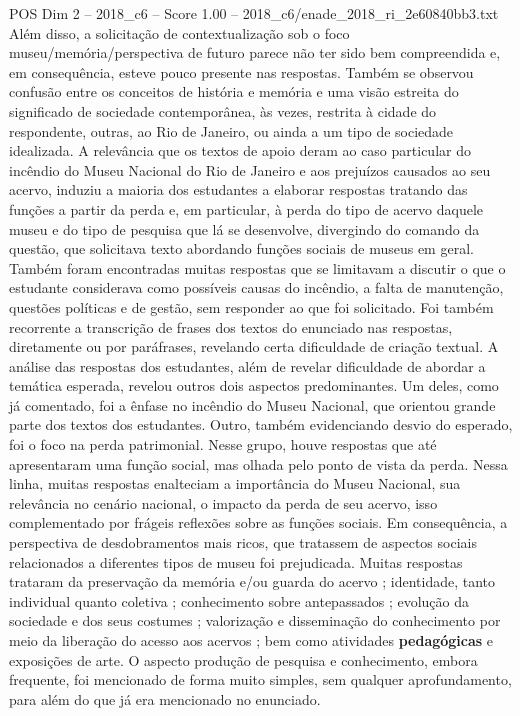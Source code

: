 \begin{textsample}{POS Dim 2 – 2018\_c6 – Score 1.00 – 2018\_c6/enade\_2018\_ri\_2e60840bb3.txt}
Além disso, a solicitação de contextualização sob o foco museu/memória/perspectiva de futuro parece não ter sido bem compreendida e, em consequência, esteve pouco presente nas respostas.
Também se observou confusão entre os conceitos de história e memória e uma visão estreita do significado de sociedade contemporânea, às vezes, restrita à cidade do respondente, outras, ao Rio de Janeiro, ou ainda a um tipo de sociedade idealizada.
A relevância que os textos de apoio deram ao caso particular do incêndio do Museu Nacional do Rio de Janeiro e aos prejuízos causados ao seu acervo, induziu a maioria dos estudantes a elaborar respostas tratando das funções a partir da perda e, em particular, à perda do tipo de acervo daquele museu e do tipo de pesquisa que lá se desenvolve, divergindo do comando da questão, que solicitava texto abordando funções sociais de museus em geral.
Também foram encontradas muitas respostas que se limitavam a discutir o que o estudante considerava como possíveis causas do incêndio, a falta de manutenção, questões políticas e de gestão, sem responder ao que foi solicitado.
Foi também recorrente a transcrição de frases dos textos do enunciado nas respostas, diretamente ou por paráfrases, revelando certa dificuldade de criação textual.
A análise das respostas dos estudantes, além de revelar dificuldade de abordar a temática esperada, revelou outros dois aspectos predominantes.
Um deles, como já comentado, foi a ênfase no incêndio do Museu Nacional, que orientou grande parte dos textos dos estudantes.
Outro, também evidenciando desvio do esperado, foi o foco na perda patrimonial.
Nesse grupo, houve respostas que até apresentaram uma função social, mas olhada pelo ponto de vista da perda.
Nessa linha, muitas respostas enalteciam a importância do Museu Nacional, sua relevância no cenário nacional, o impacto da perda de seu acervo, isso complementado por frágeis reflexões sobre as funções sociais.
Em consequência, a perspectiva de desdobramentos mais ricos, que tratassem de aspectos sociais relacionados a diferentes tipos de museu foi prejudicada.
Muitas respostas trataram da preservação da memória e/ou guarda do acervo ; identidade, tanto individual quanto coletiva ; conhecimento sobre antepassados ; evolução da sociedade e dos seus costumes ; valorização e disseminação do conhecimento por meio da liberação do acesso aos acervos ; bem como atividades \textbf{pedagógicas} e exposições de arte.
O aspecto produção de pesquisa e conhecimento, embora frequente, foi mencionado de forma muito simples, sem qualquer aprofundamento, para além do que já era mencionado no enunciado.

\end{textsample}
